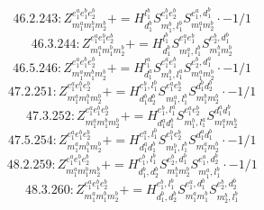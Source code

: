 \documentclass[letterpaper,10pt,fleqn,leqno,onecolumn]{article}
\begin{document}
\begin{equation} \;\;\;\;\;\;  46.2.243: Z^{e_{1}^{a}e_{1}^{b}e_{2}^{b}}_{m_{1}^{a}m_{1}^{b}m_{2}^{b}}+=H^{l_{1}^{b}}_{d_{1}^{b}}S^{e_{1}^{b}e_{2}^{b}}_{m_{1}^{b},l_{1}^{b}}S^{e_{1}^{a},d_{1}^{b}}_{m_{1}^{a}m_{2}^{b}}\cdot -1/1 \end{equation}
\begin{equation} \;\;\;\;\;\;  46.3.244: Z^{e_{1}^{a}e_{1}^{b}e_{2}^{b}}_{m_{1}^{a}m_{1}^{b}m_{2}^{b}}+=H^{l_{1}^{b}}_{d_{1}^{b}}S^{e_{1}^{a}e_{1}^{b}}_{m_{1}^{a},l_{1}^{b}}S^{e_{2}^{b},d_{1}^{b}}_{m_{1}^{b}m_{2}^{b}} \end{equation}
\begin{equation} \;\;\;\;\;\;  46.5.246: Z^{e_{1}^{a}e_{1}^{b}e_{2}^{b}}_{m_{1}^{a}m_{1}^{b}m_{2}^{b}}+=H^{l_{1}^{a}}_{d_{1}^{a}}S^{e_{1}^{a}e_{1}^{b}}_{m_{1}^{b},l_{1}^{a}}S^{e_{2}^{b},d_{1}^{a}}_{m_{1}^{a}m_{2}^{b}}\cdot -1/1 \end{equation}
\begin{equation} \;\;\;\;\;\;  47.2.251: Z^{e_{1}^{a}e_{1}^{b}e_{2}^{b}}_{m_{1}^{a}m_{1}^{b}m_{2}^{b}}+=H^{e_{1}^{b},l_{1}^{b}}_{d_{1}^{b}d_{2}^{b}}S^{e_{1}^{a}e_{2}^{b}}_{m_{1}^{a},l_{1}^{b}}S^{d_{1}^{b}d_{2}^{b}}_{m_{1}^{b}m_{2}^{b}}\cdot -1/1 \end{equation}
\begin{equation} \;\;\;\;\;\;  47.3.252: Z^{e_{1}^{a}e_{1}^{b}e_{2}^{b}}_{m_{1}^{a}m_{1}^{b}m_{2}^{b}}+=H^{e_{1}^{b},l_{1}^{a}}_{d_{1}^{a}d_{1}^{b}}S^{e_{1}^{a}e_{2}^{b}}_{m_{1}^{b},l_{1}^{a}}S^{d_{1}^{a}d_{1}^{b}}_{m_{1}^{a}m_{2}^{b}} \end{equation}
\begin{equation} \;\;\;\;\;\;  47.5.254: Z^{e_{1}^{a}e_{1}^{b}e_{2}^{b}}_{m_{1}^{a}m_{1}^{b}m_{2}^{b}}+=H^{e_{1}^{a},l_{1}^{b}}_{d_{1}^{a}d_{1}^{b}}S^{e_{1}^{b}e_{2}^{b}}_{m_{1}^{b},l_{1}^{b}}S^{d_{1}^{a}d_{1}^{b}}_{m_{1}^{a}m_{2}^{b}}\cdot -1/1 \end{equation}
\begin{equation} \;\;\;\;\;\;  48.2.259: Z^{e_{1}^{a}e_{1}^{b}e_{2}^{b}}_{m_{1}^{a}m_{1}^{b}m_{2}^{b}}+=H^{e_{1}^{b},l_{1}^{b}}_{d_{1}^{b},d_{2}^{b}}S^{e_{2}^{b},d_{1}^{b}}_{m_{1}^{b}m_{2}^{b}}S^{e_{1}^{a},d_{2}^{b}}_{m_{1}^{a},l_{1}^{b}}\cdot -1/1 \end{equation}
\begin{equation} \;\;\;\;\;\;  48.3.260: Z^{e_{1}^{a}e_{1}^{b}e_{2}^{b}}_{m_{1}^{a}m_{1}^{b}m_{2}^{b}}+=H^{e_{1}^{b},l_{1}^{b}}_{d_{1}^{b},d_{2}^{b}}S^{e_{1}^{a},d_{1}^{b}}_{m_{1}^{a}m_{1}^{b}}S^{e_{2}^{b},d_{2}^{b}}_{m_{2}^{b},l_{1}^{b}} \end{equation}
\end{document}

